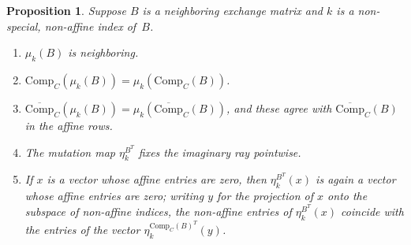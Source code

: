 \documentclass[10pt]{article}
\newtheorem{proposition}{Proposition}[section]
\theoremstyle{definition}
\theoremstyle{remark}
\numberwithin{equation}{section}
\newcommand{\0}{{\mathbf{0}}}
\newcommand{\Comp}{\mathrm{Comp}_C}
\newcommand{\CompPlus}{\overline{\mathrm{Comp}}_C}
\begin{document}
\begin{proposition}\label{nonspecial mut}
Suppose $B$ is a neighboring exchange matrix and $k$ is a non-special, non-affine index of~$B$.
\begin{enumerate}[label=\bf\arabic*., ref=\arabic*]
\item
$\mu_k(B)$ is neighboring.
\item
$\Comp(\mu_k(B))=\mu_k(\Comp(B))$.
\item
$\CompPlus(\mu_k(B))=\mu_k(\CompPlus(B))$, and these agree with $\CompPlus(B)$ in the affine rows.
\item
The mutation map $\eta^{B^T}_k$ fixes the imaginary ray pointwise.
\item
If $x$ is a vector whose affine entries are zero, then $\eta^{B^T}_k(x)$ is again a vector whose affine entries are zero; writing $y$ for the projection of $x$ onto the subspace of non-affine indices, the non-affine entries of $\eta^{B^T}_k(x)$ coincide with the entries of the vector $\eta^{\Comp(B)^T}_k(y)$.
\end{enumerate}
\end{proposition}
\end{document}
